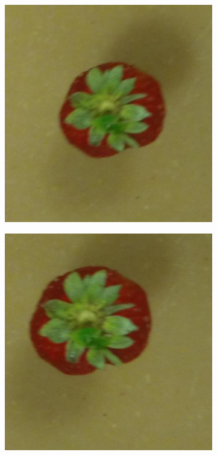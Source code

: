 \documentclass {udthesis}
\begin{document}
\begin{figure}
\begin{subfigure}[]{0.12\textwidth}
      \caption{}
  \end{subfigure}
  \begin{subfigure}[]{0.12\textwidth}
      \includegraphics[width=\textwidth]{strawberry4_obj_01/strawberry4_001_16}
      \caption{}
  \end{subfigure}
  \begin{subfigure}[]{0.12\textwidth}
      \includegraphics[width=\textwidth]{strawberry4_obj_01/strawberry4_001_14}

\end{subfigure}
\end{figure}
\end{document}
